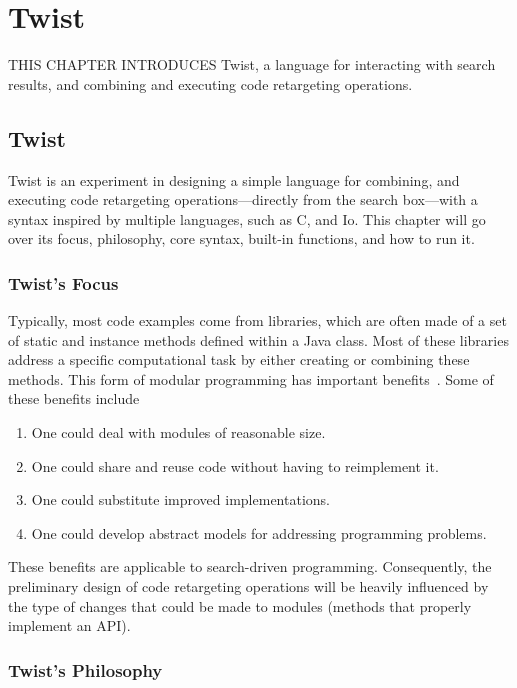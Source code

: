\chapter{Twist}{}
\label{chap:twist}

\lettrine[lraise=0.1, nindent=0em, slope=-.5em]{T}{HIS CHAPTER INTRODUCES} Twist, a language for interacting with search results, and combining and executing code retargeting operations. 

\section{Twist}
\label{sec:twist}

Twist is an experiment in designing a simple language for combining, and executing code retargeting operations---directly from the search box---with a syntax inspired by multiple languages, such as C, and Io. This chapter will go over its focus, philosophy, core syntax, built-in functions, and how to run it.

\subsection{Twist's Focus}
\label{sec:focus}

Typically, most code examples come from libraries, which are often made of a set of static and instance methods defined within a Java class. Most of these libraries address a specific computational task by either creating or combining these methods. This form of modular programming has important benefits~\cite{Sedgewick:2011tx}. Some of these benefits include 

\begin{enumerate}
	\item One could deal with modules of reasonable size.
	\item One could share and reuse code without having to reimplement it.
	\item One could substitute improved implementations.
	\item One could develop abstract models for addressing programming problems.
\end{enumerate}

These benefits are applicable to search-driven programming. Consequently, the preliminary design of code retargeting operations will be heavily influenced by the type of changes that could be made to modules (methods that properly implement an API).

\subsection{Twist's Philosophy}
\label{sec:philosophy}

